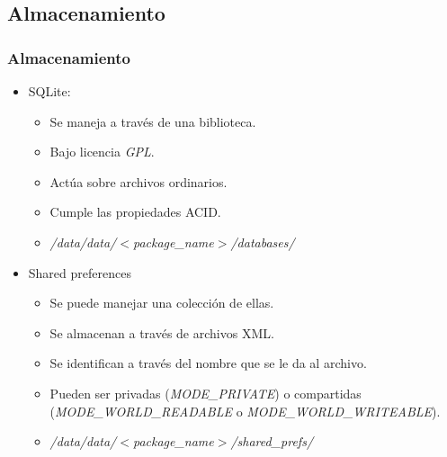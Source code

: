 \subsection{Almacenamiento}
\begin{frame}
  \frametitle{Almacenamiento}
  \begin{itemize}
      \item SQLite: 
      \begin{itemize}
	  \item Se maneja a través de una biblioteca.
	  
	  \item Bajo licencia \textit{GPL}.
	  
	  \item Actúa sobre archivos ordinarios.

	  \item Cumple las propiedades ACID.
	  
	  \item \textit{/data/data/$<$package\_name$>$/databases/}
      \end{itemize}
      
      \item Shared preferences
      \begin{itemize}
	  \item Se puede manejar una colección de ellas.
	  
	  \item Se almacenan a través de archivos XML.
	  
	  \item Se identifican a través del nombre que se le da al archivo.
	  
	  \item Pueden ser privadas (\textit{MODE\_PRIVATE}) o compartidas (\textit{MODE\_WORLD\_READABLE} o \textit{MODE\_WORLD\_WRITEABLE}).
	  
	  \item \textit{/data/data/$<$package\_name$>$/shared\_prefs/}
      \end{itemize}
  \end{itemize}
\end{frame}

